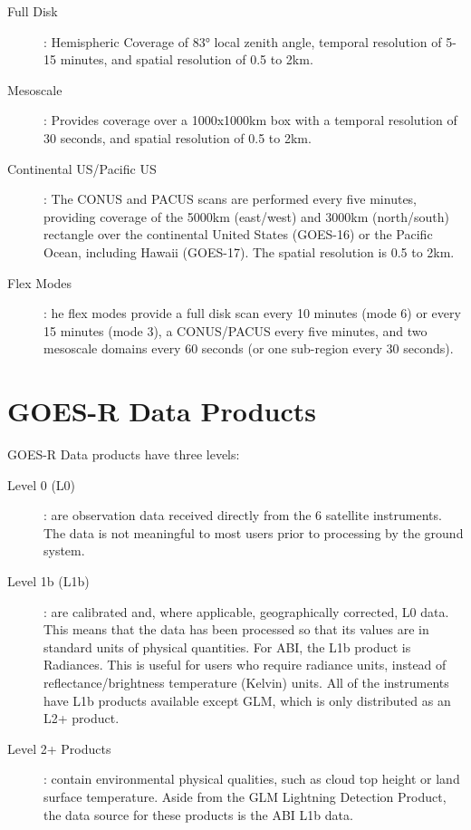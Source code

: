 \begin{description}
\item[Full Disk] : Hemispheric Coverage of 83° local zenith angle, temporal resolution of 5-15 minutes, and spatial resolution of 0.5 to 2km.
\item[ Mesoscale]: Provides coverage over a 1000x1000km box with a temporal resolution of 30 seconds, and spatial resolution of 0.5 to 2km.
\item[ Continental US/Pacific US]: The CONUS and PACUS scans are performed every five minutes, providing coverage of the 5000km (east/west) and 3000km (north/south) rectangle over the continental United States (GOES-16) or the Pacific Ocean, including Hawaii (GOES-17). The spatial resolution is 0.5 to 2km.
\item[ Flex Modes]: he flex modes provide a full disk scan every 10 minutes (mode 6) or every 15 minutes (mode 3), a CONUS/PACUS every five minutes, and two mesoscale domains every 60 seconds (or one sub-region every 30 seconds).
\end{description}
\section{GOES-R Data Products}
GOES-R Data products have three levels:
\begin{description}
\item [Level 0 (L0)] : are observation data received directly from the 6 satellite instruments. The data is not meaningful to most users prior to processing by the ground system.
\item [Level 1b (L1b)] : are calibrated and, where applicable, geographically corrected, L0 data. This means that the data has been processed so that its values are in standard units of physical quantities. For ABI, the L1b product is Radiances.
This is useful for users who require radiance units, instead of reflectance/brightness temperature (Kelvin) units.
All of the instruments have L1b products available except GLM, which is only distributed as an L2+ product.
\item [Level 2+ Products] : contain environmental physical qualities, such as cloud top height or land surface temperature.
Aside from the GLM Lightning Detection Product, the data source for these products is the ABI L1b data.
\end{description}
